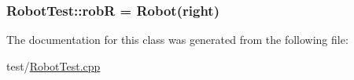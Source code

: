 \subsubsection[{\texorpdfstring{robR}{robR}}]{ Robot\+Test\+::robR = {\bf Robot}({\bf right})\hspace{0.3cm}{\ttfamily [protected]}}\hypertarget{class_robot_test_aed2ebf652db21d16a87b9fee909654b9}{}\label{class_robot_test_aed2ebf652db21d16a87b9fee909654b9}


The documentation for this class was generated from the following file\+:\begin{DoxyCompactItemize}
\item 
test/\hyperlink{_robot_test_8cpp}{Robot\+Test.\+cpp}\end{DoxyCompactItemize}
